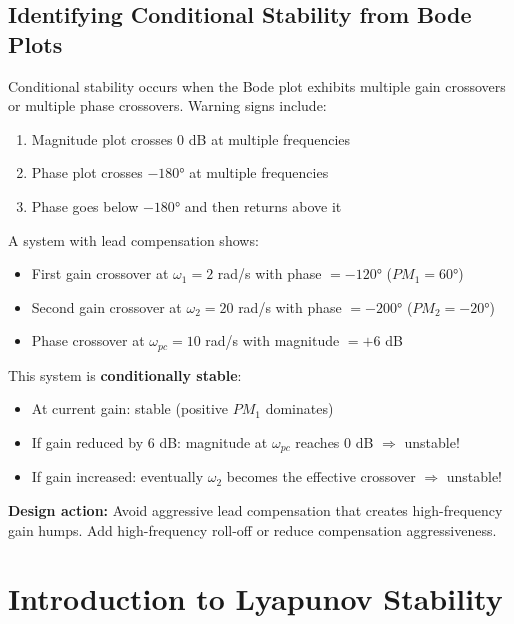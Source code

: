 \subsection{Identifying Conditional Stability from Bode Plots}

Conditional stability occurs when the Bode plot exhibits multiple gain crossovers or multiple phase crossovers. Warning signs include:

\begin{enumerate}
    \item Magnitude plot crosses 0 dB at multiple frequencies
    \item Phase plot crosses $-180°$ at multiple frequencies
    \item Phase goes below $-180°$ and then returns above it
\end{enumerate}

\begin{example}
\label{ex:conditional_stability}
A system with lead compensation shows:
\begin{itemize}
    \item First gain crossover at $\omega_1 = 2$ rad/s with phase $= -120°$ ($PM_1 = 60°$)
    \item Second gain crossover at $\omega_2 = 20$ rad/s with phase $= -200°$ ($PM_2 = -20°$)
    \item Phase crossover at $\omega_{pc} = 10$ rad/s with magnitude $= +6$ dB
\end{itemize}

This system is \textbf{conditionally stable}:
\begin{itemize}
    \item At current gain: stable (positive $PM_1$ dominates)
    \item If gain reduced by 6 dB: magnitude at $\omega_{pc}$ reaches 0 dB $\Rightarrow$ unstable!
    \item If gain increased: eventually $\omega_2$ becomes the effective crossover $\Rightarrow$ unstable!
\end{itemize}

\textbf{Design action:} Avoid aggressive lead compensation that creates high-frequency gain humps. Add high-frequency roll-off or reduce compensation aggressiveness.
\end{example}

\section{Introduction to Lyapunov Stability}
\label{sec:lyapunov}

